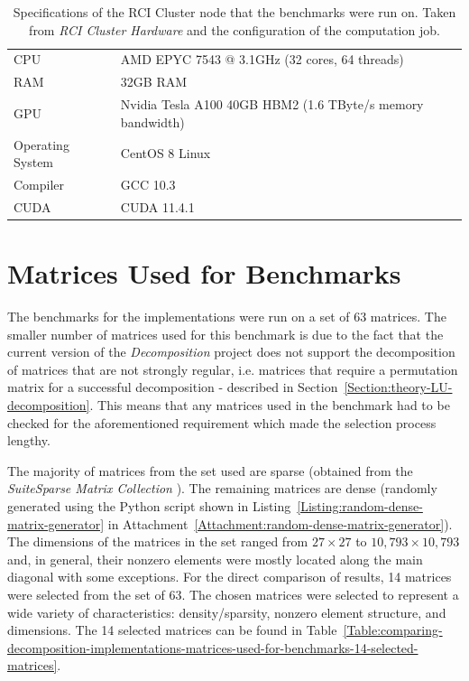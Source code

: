 \begin{table}[ht!]
	\centering
	\begin{tabular}{|l|l|}
		\hline
		CPU              & AMD EPYC 7543 @ 3.1GHz (32 cores, 64 threads) \\
		RAM              & 32GB RAM \\
		GPU              & Nvidia Tesla A100 40GB HBM2 (1.6 TByte/s memory bandwidth) \\
		Operating System & CentOS 8 Linux \\
		Compiler         & GCC 10.3 \\
		CUDA             & CUDA 11.4.1 \\ \hline
	\end{tabular}
	\caption{Specifications of the  RCI Cluster node that the benchmarks were run on. Taken from \emph{RCI Cluster Hardware} \cite{VVJW5lCpZRWyg8xc} and the configuration of the computation job.}
	\label{Table:comparing-decomposition-implementations-benchmark-platform-specifications}
\end{table}



\section{Matrices Used for Benchmarks}
The benchmarks for the implementations were run on a set of 63 matrices. The smaller number of matrices used for this benchmark is due to the fact that the current version of the \textit{Decomposition} project does not support the decomposition of matrices that are not strongly regular, i.e. matrices that require a permutation matrix for a successful decomposition - described in Section~\ref{Section:theory-LU-decomposition}. This means that any matrices used in the benchmark had to be checked for the aforementioned requirement which made the selection process lengthy.
\par The majority of matrices from the set used are sparse (obtained from the \emph{SuiteSparse Matrix Collection} \cite{Davis2011}). The remaining matrices are dense (randomly generated using the Python script shown in Listing~\ref{Listing:random-dense-matrix-generator} in Attachment~\ref{Attachment:random-dense-matrix-generator}). The dimensions of the matrices in the set ranged from $ 27 \times 27 $ to $ 10,793 \times 10,793 $ and, in general, their nonzero elements were mostly located along the main diagonal with some exceptions. For the direct comparison of results, 14 matrices were selected from the set of 63. The chosen matrices were selected to represent a wide variety of characteristics: density/sparsity, nonzero element structure, and dimensions. The 14 selected matrices can be found in Table~\ref{Table:comparing-decomposition-implementations-matrices-used-for-benchmarks-14-selected-matrices}.

